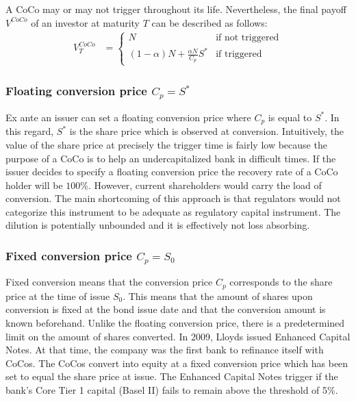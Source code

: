 A CoCo may or may not trigger throughout its life. Nevertheless, the final payoff $V^{CoCo}$ of an investor at maturity $T$ can be described as follows:
\begin{align}\label{valueatmaturity}
    V^{CoCo}_T &= \begin{cases} N & \text{if not triggered} \\ (1 - \alpha) N + \frac{\alpha N}{C_p} S^{*} & \text{if triggered} \end{cases}
\end{align}

\subsubsection*{Floating conversion price $C_p = S^*$}
Ex ante an issuer can set a floating conversion price where $C_p$ is equal to $S^*$. In this regard, $S^*$ is the share price which is observed at conversion. Intuitively, the value of the share price at precisely the trigger time is fairly low because the purpose of a CoCo is to help an undercapitalized bank in difficult times. If the issuer decides to specify a floating conversion price the recovery rate of a CoCo holder will be $100\%$. However, current shareholders would carry the load of conversion. 
The main shortcoming of this approach is that regulators would not categorize this instrument to be adequate as regulatory capital instrument. The dilution is potentially unbounded and it is effectively not loss absorbing. \citep{de2014handbook}

\subsubsection*{Fixed conversion price $C_p = S_0$}
Fixed conversion means that the conversion price $C_p$ corresponds to the share price at the time of issue $S_0$. This means that the amount of shares upon conversion is fixed at the bond issue date and that the conversion amount is known beforehand. Unlike the floating conversion price, there is a predetermined limit on the amount of shares converted. \citep{de2014handbook} In 2009, Lloyds issued Enhanced Capital Notes. At that time, the company was the first bank to refinance itself with CoCos. The CoCos convert into equity at a fixed conversion price which has been set to equal the share price at issue. The Enhanced Capital Notes trigger if the bank's Core Tier 1 capital (Basel II) fails to remain above the threshold of 5\%. %

